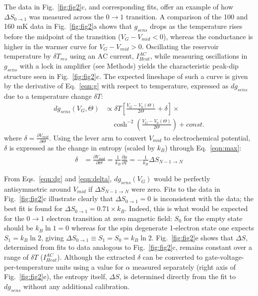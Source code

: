 \documentclass[twocolumn,showpacs,preprintnumbers,amsmath,amssymb,pra,aps,superscriptaddress]{revtex4-1}
\begin{document}
The data in Fig.~\ref{fig:fig2}c, and corresponding fits, offer an example of how $\Delta S_{0\rightarrow 1}$ was measured across the $0 \rightarrow 1$ transition. A comparison of the 100 and 160 mK data in Fig.~\ref{fig:fig2}a shows that $g_{sens}$ drops as the temperature rises before the midpoint of the transition ($V_G-V_{mid}<0$), whereas the conductance is higher in the warmer curve for $V_G-V_{mid}>0$.   Oscillating the reservoir temperature by $\delta T_{res}$ using an AC current, $I^{AC}_{Heat}$, while measuring oscillations in $g_{sens}$ with a lock in amplifier (see Methods) yields the characteristic peak-dip structure seen in Fig.~\ref{fig:fig2}c.  The expected lineshape of such a curve is given by the derivative of Eq.~\ref{eqn:g} with respect to temperature, expressed as $dg_{sens}$ due to a temperature change $\delta T$:
%
\begin{align}
\label{eqn:dg}
        dg_{sens}(V_G, \Theta) &\propto \delta T \left[ \frac{V_G-V_{0}(\Theta)}{2\Theta} +\delta \right]\times \\
        				      &\quad\cosh^{-2}\left(\frac{V_G-V_{0}(\Theta)}{2\Theta}\right) + const. \nonumber
\end{align}
%
where $\delta=\frac{\partial V_{mid}}{\partial \Theta}$. Using the lever arm to convert $V_{mid}$ to electrochemical potential, $\delta$ is expressed as the change in entropy (scaled by $k_B$) through Eq.~\ref{eqn:max}:
%
\begin{align}
\label{eqn:delta}
        \delta &= \frac{\partial V_{mid}}{\partial \Theta} = 
        \frac{1}{k_B} \frac{\partial \mu}{\partial T} = 
        -\frac{1}{k_B} \Delta S_{N-1\rightarrow N}
\end{align}
%

From Eqs.~\ref{eqn:dg} and \ref{eqn:delta}, $dg_{sens}(V_G)$ would be perfectly antisymmetric around $V_{mid}$ if $\Delta S_{N-1\rightarrow N}$ were zero.  Fits to the data in Fig.~\ref{fig:fig2}c illustrate clearly that $\Delta S_{0\rightarrow 1}=0$ is inconsistent with the data;  the best fit is found for $\Delta S_{0\rightarrow 1}=0.71\times k_B$.  Indeed, this is what would be expected for the $0 \rightarrow 1$ electron transition at zero magnetic field: $S_0$ for the empty state should be $k_B \ln{1}=0$ whereas for the spin degenerate 1-electron state one expects $S_1=k_B\ln{2}$, giving $\Delta S_{0\rightarrow 1}\equiv S_1 = S_0 =k_B\ln{2}$. Fig.~\ref{fig:fig2}e shows that $\Delta S$,  determined from fits to data analogous to Fig.~\ref{fig:fig2}c, remains constant over a range of $\delta T$ ($I^{AC}_{Heat}$).  Although the extracted $\delta$ can be converted to gate-voltage-per-temperature units using a value for $\alpha$ measured separately (right axis of Fig.~\ref{fig:fig2}e), the entropy itself, $\Delta S$, is determined directly from the fit to $dg_{sens}$ without any additional calibration.
\end{document}
